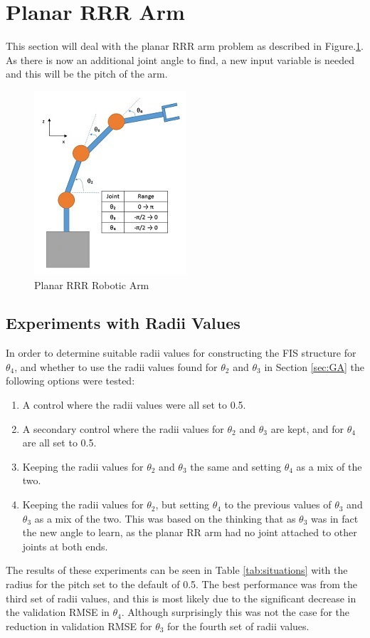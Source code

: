 \documentclass[11.5pt, twoside, a4paper]{article}
\begin{document}
\section{Planar RRR Arm}

This section will deal with the planar RRR arm problem as described in Figure.\ref{fig:3Link}. As there is now an additional joint angle to find, a new input variable is needed and this will be the pitch of the arm.
\begin{figure} 
\begin{center}
\includegraphics{3Link.jpg}
\caption{Planar RRR Robotic Arm \label{fig:3Link}}
\end{center}
\end{figure}

\subsection{Experiments with Radii Values}
In order to determine suitable radii values for constructing the FIS structure for $\theta_4$, and whether to use the radii values found for $\theta_2$ and $\theta_3$ in Section \ref{sec:GA} the following options were tested:
\begin{enumerate}
\item A control where the radii values were all set to 0.5.
\item A secondary control where the radii values for $\theta_2$ and $\theta_3$ are kept, and for $\theta_4$ are all set to 0.5.
\item Keeping the radii values for $\theta_2$ and $\theta_3$ the same and setting $\theta_4$ as a mix of the two.
\item Keeping the radii values for $\theta_2$, but setting $\theta_4$ to the previous values of $\theta_3$ and $\theta_3$ as a mix of the two. This was based on the thinking that as $\theta_3$ was in fact the new angle to learn, as the planar RR arm had no joint attached to other joints at both ends.
\end{enumerate}
The results of these experiments can be seen in Table \ref{tab:situations} with the radius for the pitch set to the default of 0.5. The best performance was from the third set of radii values, and this is most likely due to the significant decrease in the validation RMSE in $\theta_4$. Although surprisingly this was not the case for the reduction in validation RMSE for $\theta_3$ for the fourth set of radii values.
\end{document}
